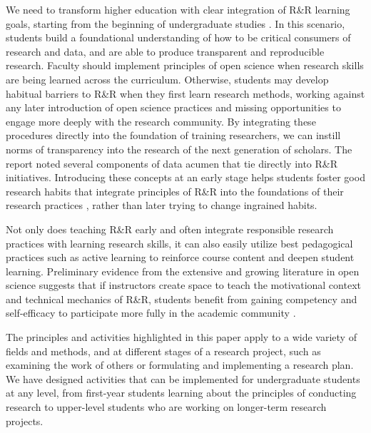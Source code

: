 \documentclass[
  12pt]{article}
\begin{document}
We need to transform higher education with clear integration of R\&R learning goals, starting from the beginning of undergraduate studies \citep{dogucu2024reproducibility}. 
In this scenario, students build a foundational understanding of how to be critical consumers of research and data, and are able to produce transparent and reproducible research.
Faculty should implement principles of open science when research skills are being learned across the curriculum.
Otherwise, students may develop habitual barriers to R\&R when they first learn research methods, working against any later introduction of open science practices and missing opportunities to engage more deeply with the research community. 
By integrating these procedures directly into the foundation of training researchers, we can instill norms of transparency into the research of the next generation of scholars. 
The \cite{NASEM:2018} report noted several components of data acumen that tie directly into R\&R initiatives.
Introducing these concepts at an early stage helps students foster good research habits that integrate principles of R\&R into the foundations of their research practices \citep{ostblom_opinionated_2022}, rather than later trying to change ingrained habits. 

Not only does teaching R\&R early and often integrate responsible research practices with learning research skills, it can also easily utilize best pedagogical practices such as active learning to reinforce course content and deepen student learning.
Preliminary evidence from the extensive and growing literature in open science suggests that if instructors create space to teach the motivational context and technical mechanics of R\&R, students benefit from gaining competency and self-efficacy to participate more fully in the academic community \citep{pownall_teaching_2023}.

The principles and activities highlighted in this paper apply to a wide variety of fields and methods, and at different stages of a research project, such as examining the work of others or formulating and implementing a research plan. 
We have designed activities that can be implemented for undergraduate students at any level, from first-year students learning about the principles of conducting research to upper-level students who are working on longer-term research projects. 
\end{document}
